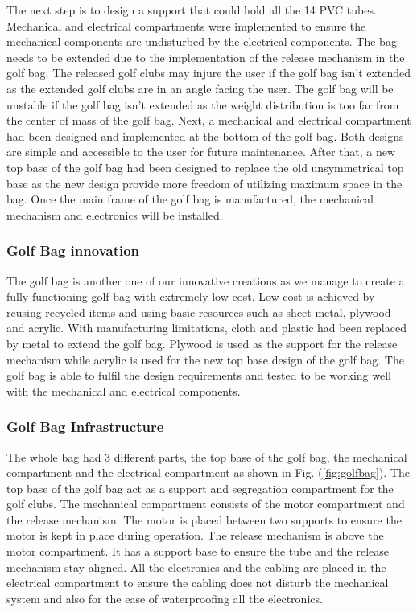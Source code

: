 \documentclass[11pt,landscape]{article}
\begin{document}
\begin{multicols}{3}
    The next step is to design a support that could hold all the 14 PVC tubes.
    Mechanical and electrical compartments were implemented to ensure the
    mechanical components are undisturbed by the electrical components. The
    bag needs to be extended due to the implementation of the release mechanism
    in the golf bag. The released golf clubs may injure the user if the golf bag
    isn’t extended as the extended golf clubs are in an angle facing the user.
    The golf bag will be unstable if the golf bag isn’t extended as the weight
    distribution is too far from the center of mass of the golf bag. Next, a
    mechanical and electrical compartment had been designed and implemented at
    the bottom of the golf bag. Both designs are simple and accessible to the
    user for future maintenance. After that, a new top base of the golf bag had
    been designed to replace the old unsymmetrical top base as the new design
    provide more freedom of utilizing maximum space in the bag. Once the main
    frame of the golf bag is manufactured, the mechanical mechanism and
    electronics will be installed. 
    
    
    \subsubsection{Golf Bag innovation}
    The golf bag is another one of our innovative creations as we manage to
    create a fully-functioning golf bag with extremely low cost. Low cost is
    achieved by reusing recycled items and using basic resources such as sheet metal,
    plywood and acrylic. With manufacturing limitations, cloth and plastic had been
    replaced by metal to extend the golf bag. Plywood is used as the support for
    the release mechanism while acrylic is used for the new top base design of
    the golf bag. The golf bag is able to fulfil the design requirements and
    tested to be working well with the mechanical and electrical components.
    
    \subsubsection{Golf Bag Infrastructure}
    The whole bag had 3 different parts, the top base of the golf bag, the
    mechanical compartment and the electrical compartment as shown in Fig.
    (\ref{fig:golfbag}). The top base of the golf bag act as a support and
    segregation compartment for the golf clubs. The mechanical compartment
    consists of the motor compartment and the release mechanism. The motor is
    placed between two supports to ensure the motor is kept in place during
    operation. The release mechanism is above the motor compartment. It has a
    support base to ensure the tube and the release mechanism stay aligned. All
    the electronics and the cabling are placed in the electrical compartment to
    ensure the cabling does not disturb the mechanical system and also for the
    ease of waterproofing all the electronics.
    

\end{multicols}
\end{document}
